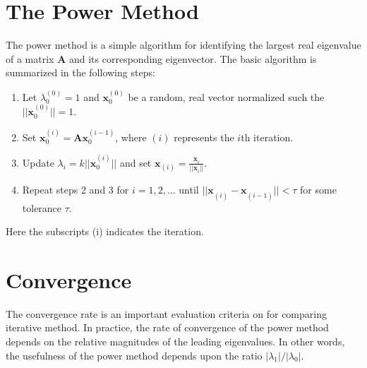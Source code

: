 \section{The Power Method}
The power method is a simple algorithm for identifying the largest real eigenvalue of a matrix $\mathbf{A}$ and its corresponding eigenvector. The basic algorithm is summarized in the following steps:
\begin{enumerate}
  \item Let $\lambda^{(0)}_0 =1 $ and $\mathbf{x}^{(0)}_0$ be a random, real vector normalized such the $||\mathbf{x}^{(0)}_0|| = 1$.
  \item Set $\mathbf{x}^{(i)}_0=\mathbf{A}\mathbf{x}^{(i-1)}_0$, where $(i)$ represents the $i$th iteration.
  \item Update $\lambda_{i} = k||\mathbf{x}^{(i)}_0||$ and set  $\mathbf{x}_{(i)} =\frac{\mathbf{x}^{}_{i}}{||\mathbf{x}^{}_{i}||}$.
  \item Repeat steps 2 and 3 for $i = 1, 2, \ldots$ until $||\mathbf{x}^{}_{(i)} - \mathbf{x}^{}_{(i-1)}|| < \tau$ for some tolerance $\tau$.
\end{enumerate}
Here the subscripts (i) indicates the iteration.

\section{Convergence}
\label{sec:convergence}
The convergence rate is an important evaluation criteria on for comparing iterative method. 
In practice, the rate of convergence of the power method depends on the relative magnitudes of the leading eigenvalues. 
In other words, the usefulness of the power method depends upon the ratio $|\lambda_1|/|\lambda_0|$.

